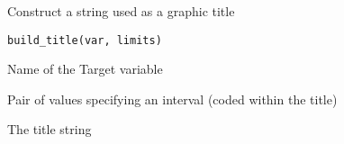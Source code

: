 %
\begin{Description}\relax
Construct a string used as a graphic title
\end{Description}
%
\begin{Usage}
\begin{verbatim}
build_title(var, limits)
\end{verbatim}
\end{Usage}
%
\begin{Arguments}
\begin{ldescription}
\item[\code{var}] 
Name of the Target variable

\item[\code{limits}] 
Pair of values specifying an interval (coded within the title)

\end{ldescription}
\end{Arguments}
%
\begin{Value}
The title string
\end{Value}
